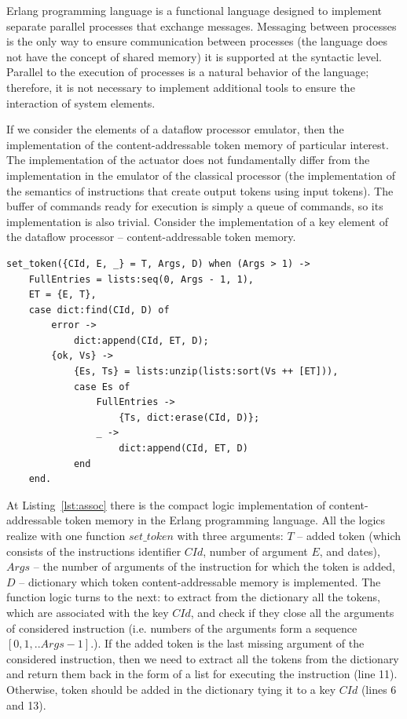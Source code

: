\documentclass[
11pt,%
tightenlines,%
twoside,%
onecolumn,%
nofloats,%
nobibnotes,%
nofootinbib,%
superscriptaddress,%
noshowpacs,%
centertags]%
{revtex4}
\begin{document}
Erlang programming language is a functional language designed to implement separate parallel processes that exchange messages. Messaging between processes is the only way to ensure communication between processes (the language does not have the concept of shared memory) it is supported at the syntactic level. Parallel to the execution of processes is a natural behavior of the language; therefore, it is not necessary to implement additional tools to ensure the interaction of system elements.

If we consider the elements of a dataflow processor emulator, then the implementation of the content-addressable token memory of particular interest. The implementation of the actuator does not fundamentally differ from the implementation in the emulator of the classical processor (the implementation of the semantics of instructions that create output tokens using input tokens). The buffer of commands ready for execution is simply a queue of commands, so its implementation is also trivial. Consider the implementation of a key element of the dataflow processor -- content-addressable token memory.

\begin{lstlisting}[caption={Implementation of the logic of the contest-addressable token memory.},label={lst:assoc}]
set_token({CId, E, _} = T, Args, D) when (Args > 1) ->
	FullEntries = lists:seq(0, Args - 1, 1),
	ET = {E, T},
	case dict:find(CId, D) of
		error ->
			dict:append(CId, ET, D);
		{ok, Vs} ->
			{Es, Ts} = lists:unzip(lists:sort(Vs ++ [ET])),
			case Es of
				FullEntries ->
					{Ts, dict:erase(CId, D)};
				_ ->
					dict:append(CId, ET, D)
			end
	end.
\end{lstlisting}

At Listing~\ref{lst:assoc} there is the compact logic implementation of content-addressable token memory in the Erlang programming language.
All the logics realize with one function $set\_token$ with three arguments: $T$ -- added token (which consists of the instructions identifier $CId$, number of argument $E$, and dates), $Args$ -- the number of arguments of the instruction for which the token is added, $D$ -- dictionary which token content-addressable memory is implemented.
The function logic turns to the next: to extract from the dictionary all the tokens, which are associated with the key $CId$, and check if they close all the arguments of considered instruction (i.e. numbers of the arguments form a sequence $[0, 1, .. Args - 1]$.).
If the added token is the last missing argument of the considered instruction, then we need to extract all the tokens from the dictionary and return them back in the form of a list for executing the instruction (line 11).
Otherwise, token should be added in the dictionary tying it to a key $CId$ (lines 6 and 13).
\end{document}
